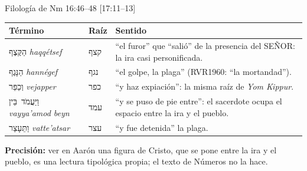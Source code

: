 \documentclass[hyperref={bookmarks=false},aspectratio=169]{beamer}
\newcommand{\heb}[1]{\mbox{\foreignlanguage{hebrew}{#1}}}
\newcommand{\SENOR}{S{\fontsize{0.78em}{1em}\selectfont EÑOR}}
\newcommand{\precision}[1]{{\footnotesize\color{gris}\textbf{Precisión:} #1}}
\begin{document}
\begin{frame}{Filología de Nm 16:46--48 [17:11--13]}
\renewcommand{\arraystretch}{1.2}\scriptsize
\begin{tabular}{@{}>{\RaggedRight\arraybackslash}p{2.9cm}>{\RaggedRight\arraybackslash}p{1.2cm}>{\RaggedRight\arraybackslash}p{7.6cm}@{}}
\toprule
\textbf{Término} & \textbf{Raíz} & \textbf{Sentido} \\ \midrule
\heb{הַקֶּצֶף} \emph{haqqétsef} & \heb{קצף} & ``el furor'' que ``salió'' de la presencia del \SENOR: la ira casi personificada. \\
\heb{הַנָּגֶף} \emph{hannégef} & \heb{נגף} & ``el golpe, la plaga'' (RVR1960: ``la mortandad''). \\
\heb{וְכַפֵּר} \emph{vejapper} & \heb{כפר} & ``y haz expiación'': la misma raíz de \emph{Yom Kippur}. \\
\heb{וַיַּעֲמֹד בֵּין} \emph{vayya'amod beyn} & \heb{עמד} & ``y se puso de pie entre'': el sacerdote ocupa el espacio entre la ira y el pueblo. \\
\heb{וַתֵּעָצַר} \emph{vatte'atsar} & \heb{עצר} & ``y fue detenida'' la plaga. \\
\bottomrule
\end{tabular}\par\medskip
\centering
{}\par\smallskip
\precision{ver en Aarón una figura de Cristo, que se pone entre la ira y el pueblo, es una lectura tipológica propia; el texto de Números no la hace.}
\end{frame}
\end{document}
